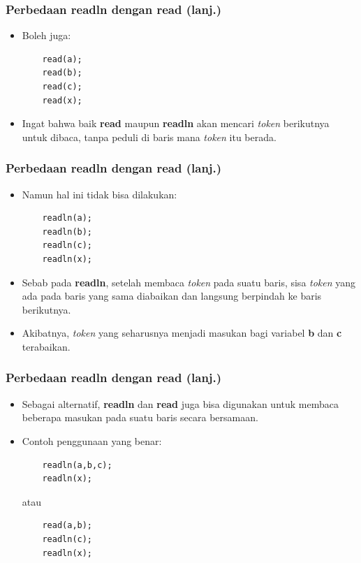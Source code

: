 \begin{frame}[fragile]
\frametitle{Perbedaan readln dengan read (lanj.)}
\begin{itemize}
  \item Boleh juga:
  \begin{lstlisting}
    read(a);
    read(b);
    read(c);
    read(x);
  \end{lstlisting}
  \item Ingat bahwa baik \textbf{read} maupun \textbf{readln} akan mencari \textit{token} berikutnya untuk dibaca, tanpa peduli di baris mana \textit{token} itu berada.
\end{itemize}
\end{frame}

\begin{frame}[fragile]
\frametitle{Perbedaan readln dengan read (lanj.)}
\begin{itemize}
  \item Namun hal ini tidak bisa dilakukan:
  \begin{lstlisting}
    readln(a);
    readln(b);
    readln(c);
    readln(x);
  \end{lstlisting}
  \item Sebab pada \textbf{readln}, setelah membaca \textit{token} pada suatu baris, sisa \textit{token} yang ada pada baris yang sama diabaikan dan langsung berpindah ke baris berikutnya.
  \item Akibatnya, \textit{token} yang seharusnya menjadi masukan bagi variabel \textbf{b} dan \textbf{c} terabaikan.
\end{itemize}
\end{frame}

\begin{frame}[fragile]
\frametitle{Perbedaan readln dengan read (lanj.)}
\begin{itemize}
  \item Sebagai alternatif, \textbf{readln} dan \textbf{read} juga bisa digunakan untuk membaca beberapa masukan pada suatu baris secara bersamaan.
  \item Contoh penggunaan yang benar:
  \begin{lstlisting}
    readln(a,b,c);
    readln(x);
  \end{lstlisting}
  atau
  \begin{lstlisting}
    read(a,b);
    readln(c);
    readln(x);
  \end{lstlisting}
\end{itemize}
\end{frame}

